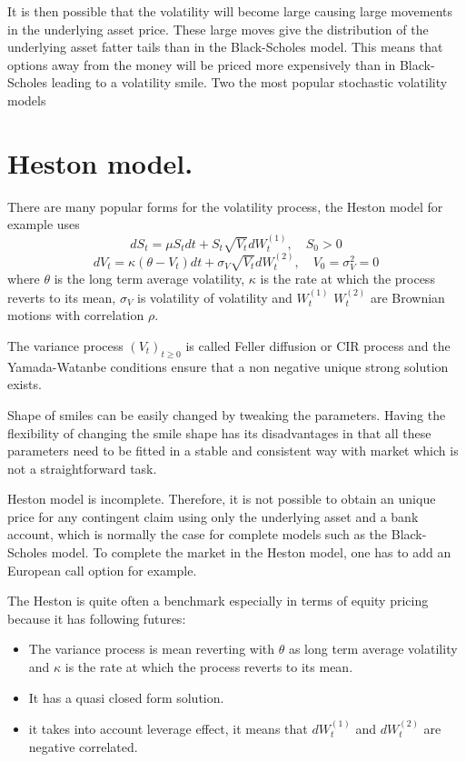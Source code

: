 \documentclass{book}
\begin{document}
It is then possible that the volatility will become large causing large movements in the underlying asset price. These large moves give the distribution of the underlying asset fatter tails than in the Black-Scholes model. This means that options away from the money will be priced more expensively than in Black-Scholes leading to a volatility smile. Two the most popular stochastic volatility models
\section{Heston model.}
There are many popular forms for the volatility process, the Heston model for example uses
$$
dS_{t}=\mu S_{t}dt+S_{t}\sqrt{V_{t}}dW_{t}^{(1)},\quad S_{0}>0
$$
$$
dV_{t}=\kappa(\theta-V_{t})dt+\sigma_{V}\sqrt{V_{t}}dW_{t}^{(2)},\quad V_{0}=\sigma_{V}^{2}=0
$$
where $\theta$ is the long term average volatility, $\kappa$ is the rate at which the process reverts to its mean, $\sigma_{V}$ is volatility of volatility and $W_{t}^{(1)}$ $W_{t}^{(2)}$ are Brownian motions with correlation $\rho.$

 The variance process $(V_{t})_{t\geq 0}$ is called Feller  diffusion or CIR process and the Yamada-Watanbe conditions ensure that a non negative unique strong solution exists.

 Shape of smiles can be easily changed by tweaking the parameters. Having the flexibility of changing the smile shape has its disadvantages in that all these parameters need to be fitted in a stable and consistent way with market which is not a straightforward task.
 
Heston model is incomplete. Therefore, it is not possible to obtain an unique price for any contingent claim using only the underlying asset and a bank account, which is normally the case for complete models such as the Black-Scholes model. To complete the market in the Heston model, one has to add an European call option for example.

The Heston is quite often a benchmark especially in terms of equity pricing because it has following futures:
\begin{itemize}
\item The variance process is mean reverting with $\theta$ as long term average volatility and $\kappa$ is the rate at which the process reverts to its mean.
\item It has a quasi closed form solution.
\item it takes into account leverage effect, it means that $dW_{t}^{(1)}$ and $dW_{t}^{(2)}$ are negative correlated.
\end{itemize}
\end{document}
